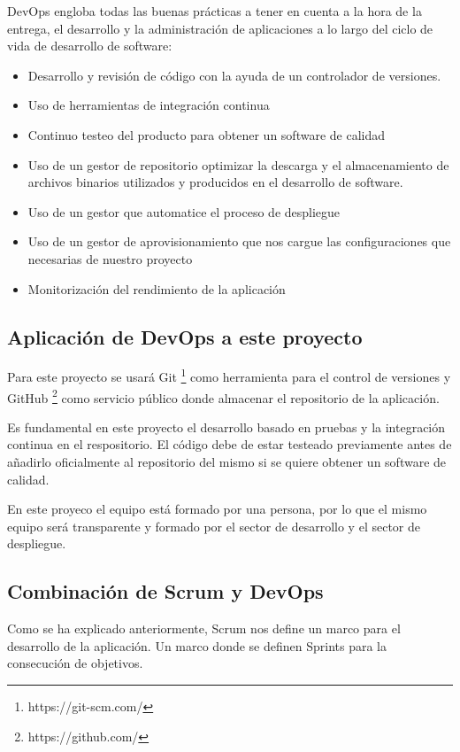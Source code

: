 DevOps engloba todas las buenas prácticas a tener en cuenta a la hora de la entrega, el desarrollo y la administración de aplicaciones a lo largo del ciclo de vida de desarrollo de software: \cite{devops7}

\begin{itemize}
    \item Desarrollo y revisión de código con la ayuda de un controlador de versiones.
    \item Uso de herramientas de integración continua
    \item Continuo testeo del producto para obtener un software de calidad
    \item Uso de un gestor de repositorio optimizar la descarga y el almacenamiento de archivos binarios utilizados y producidos en el desarrollo de software.
    \item Uso de un gestor que automatice el proceso de despliegue
    \item Uso de un gestor de aprovisionamiento que nos cargue las configuraciones que necesarias de nuestro proyecto
    \item Monitorización del rendimiento de la aplicación
\end{itemize}

\subsection{Aplicación de DevOps a este proyecto}

Para este proyecto se usará Git \footnote{https://git-scm.com/} como herramienta para el control de versiones y GitHub \footnote{https://github.com/} como servicio público donde almacenar el repositorio de la aplicación.

Es fundamental en este proyecto el desarrollo basado en pruebas y la integración continua en el respositorio. El código debe de estar testeado previamente antes de añadirlo oficialmente al repositorio del mismo si se quiere obtener un software de calidad.

En este proyeco el equipo está formado por una persona, por lo que el mismo equipo será transparente y formado por el sector de desarrollo y el sector de despliegue.


\subsection{Combinación de Scrum y DevOps}

Como se ha explicado anteriormente, Scrum nos define un marco para el desarrollo de la aplicación. Un marco donde se definen Sprints para la consecución de objetivos.

